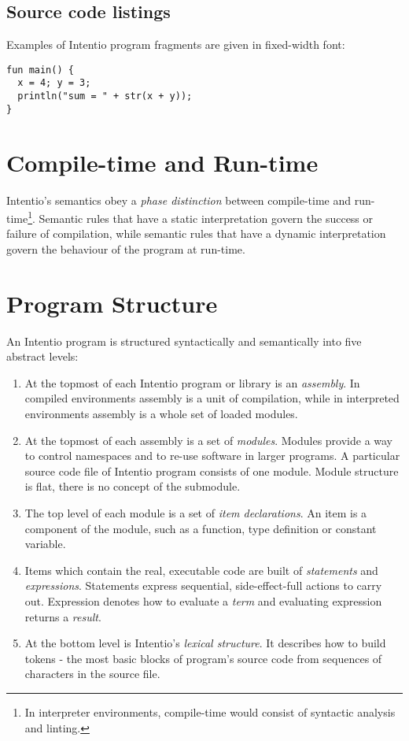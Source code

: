 \subsection*{Source code listings}

Examples of Intentio program fragments are given in fixed-width font:

\begin{lstlisting}[language=intentio]
fun main() {
  x = 4; y = 3;
  println("sum = " + str(x + y));
}
\end{lstlisting}


\section{Compile-time and Run-time}

Intentio's semantics obey a \emph{phase distinction} between compile-time and run-time\footnote{In interpreter environments, compile-time would consist of syntactic analysis and linting.}. Semantic rules that have a static interpretation govern the success or failure of compilation, while semantic rules that have a dynamic interpretation govern the behaviour of the program at run-time.


\section{Program Structure}

An Intentio program is structured syntactically and semantically into five abstract levels:

\begin{enumerate}
  \item At the topmost of each Intentio program or library is an \emph{assembly}. In compiled environments assembly is a unit of compilation, while in interpreted environments assembly is a whole set of loaded modules.
  \item At the topmost of each assembly is a set of \emph{modules}. Modules provide a way to control namespaces and to re-use software in larger programs. A particular source code file of Intentio program consists of one module. Module structure is flat, there is no concept of the submodule.
  \item The top level of each module is a set of \emph{item declarations}. An item is a component of the module, such as a function, type definition or constant variable.
  \item Items which contain the real, executable code are built of \emph{statements} and \emph{expressions}. Statements express sequential, side-effect-full actions to carry out. Expression denotes how to evaluate a \emph{term} and evaluating expression returns a \emph{result}.
  \item At the bottom level is Intentio's \emph{lexical structure}. It describes how to build tokens - the most basic blocks of program's source code from sequences of characters in the source file.
\end{enumerate}


